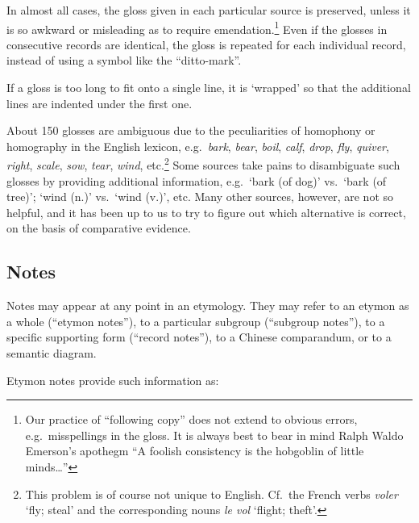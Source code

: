 In almost all cases, the gloss given in each particular source is preserved,
unless it is so awkward or misleading as to require emendation.\footnote{Our practice of “following copy” does not extend to obvious errors, e.g.\ misspellings in the gloss. It is always best to bear in mind Ralph Waldo Emerson’s apothegm “A foolish consistency is the hobgoblin of little minds…”} Even if the
glosses in consecutive records are identical, the gloss is repeated for each
individual record, instead of using a symbol like the “ditto-mark”.

If a gloss is too long to fit onto a single line, it is ‘wrapped’ so that
the additional lines are indented under the first one.


About 150 glosses are ambiguous due to the peculiarities of homophony or homography in the English lexicon, e.g.\ \textit{bark}, \textit{bear}, \textit{boil}, \textit{calf}, \textit{drop}, \textit{fly}, \textit{quiver}, \textit{right}, \textit{scale}, \textit{sow}, \textit{tear}, \textit{wind}, etc.\footnote{This problem is of course not unique to English. Cf.\ the French verbs \textit{voler} ‘fly; steal’ and the corresponding nouns \textit{le vol} ‘flight; theft’.} Some sources take pains to disambiguate such glosses by providing additional information, e.g.\ ‘bark (of dog)’ vs.\ ‘bark (of tree)’; ‘wind (n.)’ vs.\ ‘wind (v.)’, etc. Many other sources, however, are not so helpful, and it has been up to us to try to figure out which alternative is correct, on the basis of comparative evidence.

\subsection{Notes}

Notes may appear at any point in an etymology. They may refer to an etymon as a whole (“etymon notes”), to a particular subgroup (“subgroup notes”), to a specific supporting form (“record notes”), to a Chinese comparandum, or to a semantic diagram.

Etymon notes provide such information as:

